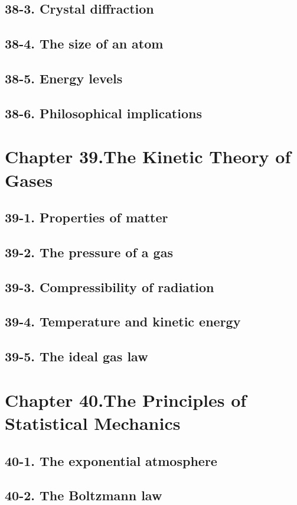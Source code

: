 \documentclass{article}
\begin{document}
\subsection{38-3. Crystal diffraction}
\subsection{38-4. The size of an atom}
\subsection{38-5. Energy levels}
\subsection{38-6. Philosophical implications}
\section{Chapter 39.The Kinetic Theory of Gases}
\subsection{39-1. Properties of matter}
\subsection{39-2. The pressure of a gas}
\subsection{39-3. Compressibility of radiation}
\subsection{39-4. Temperature and kinetic energy}
\subsection{39-5. The ideal gas law}
\section{Chapter 40.The Principles of Statistical Mechanics}
\subsection{40-1. The exponential atmosphere}
\subsection{40-2. The Boltzmann law}
\end{document}
